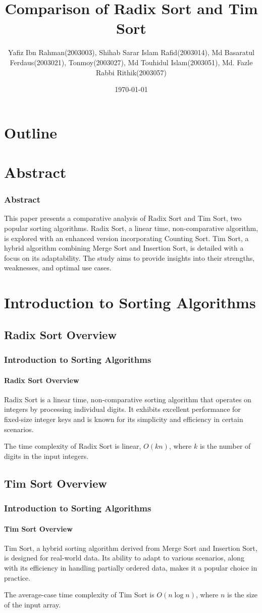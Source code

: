 \documentclass{beamer}
\title[Comparison of Radix Sort and Tim Sort]{Comparison of Radix Sort and Tim Sort}
\author[Yafiz Ibn Rahman, Shihab Sarar Islam, Md Basaratul Ferdaus, Tonmoy, Md Touhidul Islam, Md. Fazle Rabbi Rithik]{Yafiz Ibn Rahman(2003003), Shihab Sarar Islam Rafid(2003014), Md Basaratul Ferdaus(2003021), Tonmoy(2003027), Md Touhidul Islam(2003051), Md. Fazle Rabbi Rithik(2003057)}
\institute[CSE, RUET]{CSE, RUET \\ Group No: 6}
\date{\today}
\begin{document}
\frame[plain]{\titlepage}

\section*{Outline}

\section{Abstract}
\begin{frame}[t]
    \frametitle{Abstract}
    \cite{verma2013new}This paper presents a comparative analysis of Radix Sort and Tim Sort, two popular sorting algorithms. Radix Sort, a linear time, non-comparative algorithm, is explored with an enhanced version incorporating Counting Sort. Tim Sort, a hybrid algorithm combining Merge Sort and Insertion Sort, is detailed with a focus on its adaptability. The study aims to provide insights into their strengths, weaknesses, and optimal use cases.
\end{frame}

\section{Introduction to Sorting Algorithms}
\subsection[Radix Sort]{Radix Sort Overview}
\begin{frame}[t]
    \frametitle{Introduction to Sorting Algorithms}
    \framesubtitle{Radix Sort Overview}
    Radix Sort is a linear time, non-comparative sorting algorithm that operates on integers by processing individual digits. It exhibits excellent performance for fixed-size integer keys and is known for its simplicity and efficiency in certain scenarios.\cite{shukla2012review}

    The time complexity of Radix Sort is linear, \(O(kn)\), where \(k\) is the number of digits in the input integers.
\end{frame}

\subsection[Tim Sort]{Tim Sort Overview}
\begin{frame}[t]
    \frametitle{Introduction to Sorting Algorithms}
    \framesubtitle{Tim Sort Overview}
    Tim Sort, a hybrid sorting algorithm derived from Merge Sort and Insertion Sort, is designed for real-world data. Its ability to adapt to various scenarios, along with its efficiency in handling partially ordered data, makes it a popular choice in practice.

    The average-case time complexity of Tim Sort is \(O(n \log n)\), where \(n\) is the size of the input array.\cite{hammad2015comparative}
\end{frame}
\end{document}
